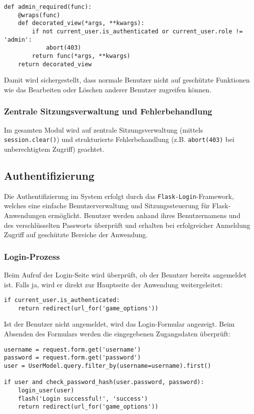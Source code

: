 \documentclass[12pt]{article}
\begin{document}
\begin{verbatim}
def admin_required(func):
    @wraps(func)
    def decorated_view(*args, **kwargs):
        if not current_user.is_authenticated or current_user.role != 'admin':
            abort(403)
        return func(*args, **kwargs)
    return decorated_view
\end{verbatim}

\noindent Damit wird sichergestellt, dass normale Benutzer nicht auf geschützte Funktionen wie das Bearbeiten oder Löschen anderer Benutzer zugreifen können.

\subsubsection*{Zentrale Sitzungsverwaltung und Fehlerbehandlung}

Im gesamten Modul wird auf zentrale Sitzungsverwaltung (mittels \verb|session.clear()|) und strukturierte Fehlerbehandlung (z.B. \verb|abort(403)| bei unberechtigtem Zugriff) geachtet.


\subsection{Authentifizierung}

Die Authentifizierung im System erfolgt durch das \texttt{Flask-Login}-Framework, welches eine einfache Benutzerverwaltung und Sitzungssteuerung für Flask-Anwendungen ermöglicht. Benutzer werden anhand ihres Benutzernamens und des verschlüsselten Passworts überprüft und erhalten bei erfolgreicher Anmeldung Zugriff auf geschützte Bereiche der Anwendung.

\subsubsection*{Login-Prozess}

Beim Aufruf der Login-Seite wird überprüft, ob der Benutzer bereits angemeldet ist. Falls ja, wird er direkt zur Hauptseite der Anwendung weitergeleitet:

\begin{verbatim}
if current_user.is_authenticated:
    return redirect(url_for('game_options'))
\end{verbatim}

\noindent Ist der Benutzer nicht angemeldet, wird das Login-Formular angezeigt. Beim Absenden des Formulars werden die eingegebenen Zugangsdaten überprüft:


\begin{verbatim}
username = request.form.get('username')
password = request.form.get('password')
user = UserModel.query.filter_by(username=username).first()

if user and check_password_hash(user.password, password):
    login_user(user)
    flash('Login successful!', 'success')
    return redirect(url_for('game_options'))
\end{verbatim}
\end{document}
